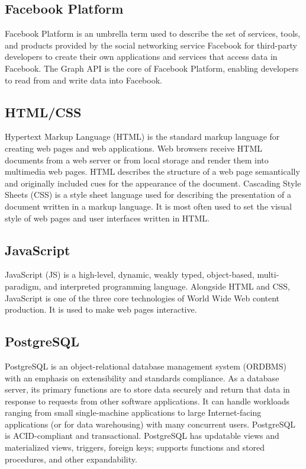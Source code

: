 \subsection{Facebook Platform}
Facebook Platform is an umbrella term used to describe the set of services, tools, and products provided by the social networking service Facebook for third-party developers to create their own applications and services that access data in Facebook. The Graph API is the core of Facebook Platform, enabling developers to read from and write data into Facebook.

\subsection{HTML/CSS}
Hypertext Markup Language (HTML) is the standard markup language for creating web pages and web applications. Web browsers receive HTML documents from a web server or from local storage and render them into multimedia web pages. HTML describes the structure of a web page semantically and originally included cues for the appearance of the document.
Cascading Style Sheets (CSS) is a style sheet language used for describing the presentation of a document written in a markup language. It is most often used to set the visual style of web pages and user interfaces written in HTML.

\subsection{JavaScript}
 JavaScript (JS) is a high-level, dynamic, weakly typed, object-based, multi-paradigm, and interpreted programming language. Alongside HTML and CSS, JavaScript is one of the three core technologies of World Wide Web content production. It is used to make web pages interactive.

\subsection{PostgreSQL}
PostgreSQL is an object-relational database management system (ORDBMS) with an emphasis on extensibility and standards compliance. As a database server, its primary functions are to store data securely and return that data in response to requests from other software applications. It can handle workloads ranging from small single-machine applications to large Internet-facing applications (or for data warehousing) with many concurrent users. PostgreSQL is ACID-compliant and transactional. PostgreSQL has updatable views and materialized views, triggers, foreign keys; supports functions and stored procedures, and other expandability.